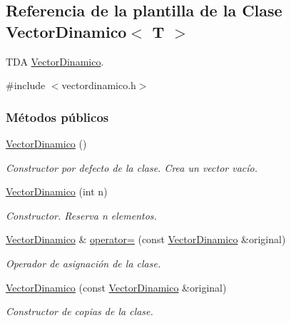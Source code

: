 \hypertarget{classVectorDinamico}{}\subsection{Referencia de la plantilla de la Clase Vector\+Dinamico$<$ T $>$}
\label{classVectorDinamico}


T\+DA \hyperlink{classVectorDinamico}{Vector\+Dinamico}.  




{\ttfamily \#include $<$vectordinamico.\+h$>$}

\subsubsection*{Métodos públicos}
\begin{DoxyCompactItemize}
\item 
\mbox{\label{classVectorDinamico_aeb7e7e31175523851a0ebde58f64df8e}} 
\hyperlink{classVectorDinamico_aeb7e7e31175523851a0ebde58f64df8e}{Vector\+Dinamico} ()
\begin{DoxyCompactList}\small\item\em Constructor por defecto de la clase. Crea un vector vacío. \end{DoxyCompactList}\item 
\hyperlink{classVectorDinamico_a034f346c2349584dfa2bb89a296f7e2e}{Vector\+Dinamico} (int n)
\begin{DoxyCompactList}\small\item\em Constructor. Reserva {\itshape n} elementos. \end{DoxyCompactList}\item 
\hyperlink{classVectorDinamico}{Vector\+Dinamico} \& \hyperlink{classVectorDinamico_ab2b6991435f3181c33f84e9d9035e960}{operator=} (const \hyperlink{classVectorDinamico}{Vector\+Dinamico} \&original)
\begin{DoxyCompactList}\small\item\em Operador de asignación de la clase. \end{DoxyCompactList}\item 
\hyperlink{classVectorDinamico_ad862884ef998b255129195619d9cb2d6}{Vector\+Dinamico} (const \hyperlink{classVectorDinamico}{Vector\+Dinamico} \&original)
\begin{DoxyCompactList}\small\item\em Constructor de copias de la clase. \end{DoxyCompactList}\item 

\end{DoxyCompactItemize}
